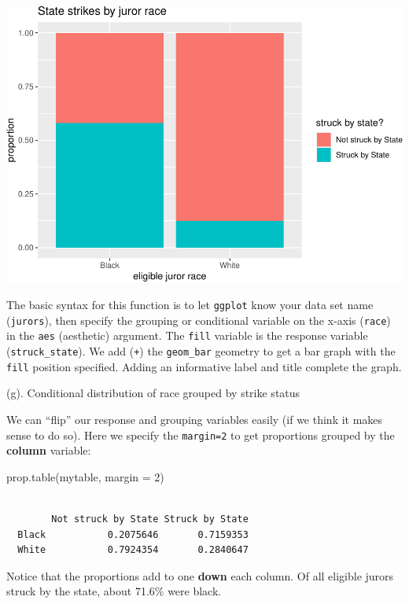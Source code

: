 \documentclass[
]{book}
\newenvironment{Shaded}{\begin{snugshade}}{\end{snugshade}}
\newcommand{\AttributeTok}[1]{\textcolor[rgb]{0.77,0.63,0.00}{#1}}
\newcommand{\DecValTok}[1]{\textcolor[rgb]{0.00,0.00,0.81}{#1}}
\newcommand{\FunctionTok}[1]{\textcolor[rgb]{0.00,0.00,0.00}{#1}}
\newcommand{\NormalTok}[1]{#1}
\begin{document}
\includegraphics[width=1\linewidth]{Class_Activity_4_files/figure-latex/unnamed-chunk-13-1}

The basic syntax for this function is to let \texttt{ggplot} know your data set name (\texttt{jurors}), then specify the grouping or conditional variable on the x-axis (\texttt{race}) in the \texttt{aes} (aesthetic) argument. The \texttt{fill} variable is the response variable (\texttt{struck\_state}). We add (\texttt{+}) the \texttt{geom\_bar} geometry to get a bar graph with the \texttt{fill} position specified. Adding an informative label and title complete the graph.

(g). Conditional distribution of race grouped by strike status

We can ``flip'' our response and grouping variables easily (if we think it makes sense to do so). Here we specify the \texttt{margin=2} to get proportions grouped by the \textbf{column} variable:

\begin{Shaded}
\begin{Highlighting}[]
\FunctionTok{prop.table}\NormalTok{(mytable, }\AttributeTok{margin =} \DecValTok{2}\NormalTok{)}
\end{Highlighting}
\end{Shaded}

\begin{verbatim}
       
        Not struck by State Struck by State
  Black           0.2075646       0.7159353
  White           0.7924354       0.2840647
\end{verbatim}

Notice that the proportions add to one \textbf{down} each column. Of all eligible jurors struck by the state, about 71.6\% were black.
\end{document}
